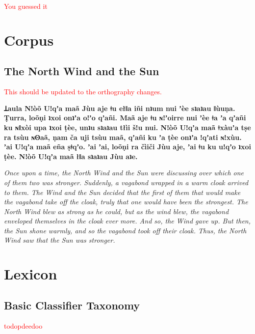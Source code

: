 \documentclass[11pt,a5paper]{book}
\newcommand{\qcn}[1]{\textcolor{AccentText}{\large\textbf{#1}}}
\newcommand{\cmnt}[1]{\textcolor{red}{#1}}
\begin{document}
\cmnt{You guessed it}

\chapter{Corpus}

\section{The North Wind and the Sun}

\cmnt{This should be updated to the orthography changes.}

\newcommand{\prose}[1]{\begin{center}\begin{minipage}{0.8\textwidth}\large #1\end{minipage}\end{center}}

\prose{\qcn{Ʇaula Nǃòõ Uǃqʼa maã Jùu aje ǂu ełǁa iñi
nʇum nui ʼèe sʇaʇau ǁùuṇa.
Ṭurra, loõṇi ʇxoi onʇʼa oǃʼo qʼañi.
Maã aje ǂu ɴǃʼoirre nui ʼèe ǂa ʼa qʼañi ku ɴǁxòi upa ʇxoi ṭèe,
unʇu sʇaʇau tłìi šǃu nui.
Nǃòõ Uǃqʼa maã ǂxàuʼa tṣe ra tsùu ɴʘaã,
ṇam ča uji tsùu maã, qʼañi ku ʼa ṭèe onʇʼa ǃqʼati ɴǃxùu.
ʼai Uǃqʼa maã eña ṣǂqʼo.
ʼai ʼai, loõṇi ra čìiči Jùu aje, ʼai ǂu ku uǃqʼo ʇxoi ṭèe.
Nǃòõ Uǃqʼa maã łǁa sʇaʇau Jùu aʇe.}}

\prose{\emph{Once upon a time, the North Wind and the Sun were discussing over which one of them two was stronger. Suddenly, a vagabond wrapped in a warm cloak arrived to them.  The Wind and the Sun decided that the first of them that would make the vagabond take off the cloak, truly that one would have been the strongest.  The North Wind blew as strong as he could, but as the wind blew, the vagabond enveloped themselves in the cloak ever more. And so, the Wind gave up. But then, the Sun shone warmly, and so the vagabond took off their cloak. Thus, the North Wind saw that the Sun was stronger.}}




\chapter{Lexicon}

\section{Basic Classifier Taxonomy}

\cmnt{todopdeedoo}
\end{document}

